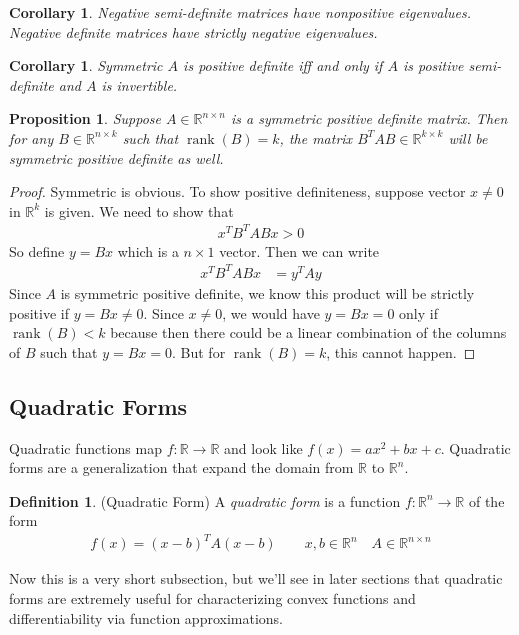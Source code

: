 \documentclass[12pt]{article}
\numberwithin{equation}{section} %
\theoremstyle{plain}
\newtheorem{prop}[thm]{Proposition}
\newtheorem{cor}[thm]{Corollary}
\theoremstyle{definition}
\newtheorem{defn}[thm]{Definition}
\theoremstyle{remark}
\newcommand{\R}{\mathbb{R}}
\newcommand{\Rn}{\mathbb{R}^n}
\newcommand{\Rk}{\mathbb{R}^k}
\newcommand{\Rnn}{\mathbb{R}^{n\times n}}
\newcommand{\Rnk}{\mathbb{R}^{n\times k}}
\newcommand{\Rkk}{\mathbb{R}^{k\times k}}
\newcommand{\rank}{\operatorname{rank}}
\begin{document}
\begin{cor}
Negative semi-definite matrices have nonpositive eigenvalues. Negative
definite matrices have strictly negative eigenvalues.
\end{cor}

\begin{cor}
Symmetric $A$ is positive definite iff and only if $A$ is positive
\emph{semi}-definite and $A$ is invertible.
\end{cor}

\begin{prop}
Suppose $A\in\Rnn$ is a symmetric positive definite matrix. Then for any
$B\in\Rnk$ such that $\rank(B)=k$, the matrix $B^TAB\in\Rkk$ will be
symmetric positive definite as well.
\end{prop}
\begin{proof}
Symmetric is obvious. To show positive definiteness,
suppose vector $x \neq 0$ in $\Rk$ is given. We need to show that
\begin{align*}
  x^T B^TABx >0
\end{align*}
So define $y=Bx$ which is a $n\times 1$ vector. Then we can write
\begin{align*}
  x^TB^TABx &= y^TAy
\end{align*}
Since $A$ is symmetric positive definite, we know this product will be
strictly positive if $y=Bx\neq 0$. Since $x\neq 0$, we would have
$y=Bx=0$ only if $\rank(B)<k$ because then there could be a linear
combination of the columns of $B$ such that $y=Bx=0$. But for
$\rank(B)=k$, this cannot happen.
\end{proof}


\clearpage
\subsection{Quadratic Forms}

Quadratic functions map $f:\R\rightarrow\R$ and look like $f(x)=ax^2 +
bx+c$. Quadratic forms are a generalization that expand the domain from
$\R$ to $\Rn$.

\begin{defn}{(Quadratic Form)}
A \emph{quadratic form} is a function $f:\Rn\rightarrow\R$ of the form
\begin{align*}
  f(x) = (x-b)^TA(x-b)
  \qquad x,b\in\Rn \quad A\in\Rnn
\end{align*}
\end{defn}

Now this is a very short subsection, but we'll see in later sections
that quadratic forms are extremely useful for characterizing convex
functions and differentiability via function approximations.
\end{document}
